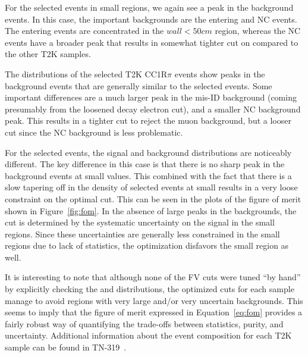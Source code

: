 For the selected \nue events in small \wall regions, we again see a peak in the
background events.  In this case, the important backgrounds are the entering and
NC events. The entering events are concentrated in the $wall < 50 cm$ region,
whereas the NC events have a broader peak that results in somewhat tighter cut
on \wall compared to the other T2K samples.

The distributions of the selected T2K \nue CC1R$\pi$ events show peaks in the
background events that are generally similar to the selected \nue events.  Some
important differences are a much larger peak in the mis-ID background (coming
presumably from the loosened decay electron cut), and a smaller NC background
peak.  This results in a tighter \towall cut to reject the muon background, but
a looser \wall cut since the NC background is less problematic.

For the selected \numu events, the signal and background distributions are
noticeably different.  The key difference in this case is that there is no
sharp peak in the background events at small \towall values.  This combined
with the fact that there is a slow tapering off in the density of selected
\numu events at small \towall results in a very loose constraint on the optimal
\towall cut.  This can be seen in the plots of the figure of merit shown in
Figure~\ref{fig:fom}.  In the absence of large peaks in the backgrounds, the
\numu \towall cut is determined by the systematic uncertainty on the signal in
the small \towall regions.  Since these uncertainties are generally less
constrained in the small \towall regions due to lack of statistics, the optimization disfavors
the small \towall region as well.

It is interesting to note that although none of the FV cuts were tuned ``by
hand'' by explicitly checking the \towall and \wall distributions, the
optimized cuts for each sample manage to avoid regions with very large and/or
very uncertain backgrounds.  This seems to imply that the figure of merit
expressed in Equation~\ref{eq:fom} provides a fairly robust way of quantifying
the trade-offs between statistics, purity, and uncertainty.  Additional
information about the event composition for each T2K sample can be found in
TN-319~\cite{tn319}.


